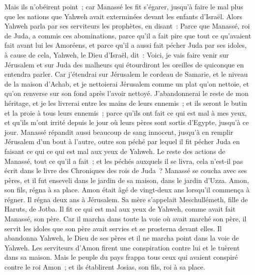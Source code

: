 \begin{multicols}{2}
Mais ils n'obéirent point~; car Manassé les fit s'égarer, jusqu'à faire le mal plus que les nations que Yahweh avait exterminées devant les enfants d'Israël.
Alors Yahweh parla par ses serviteurs les prophètes, en disant~:
Parce que Manassé, roi de Juda, a commis ces abominations, parce qu'il a fait pire que tout ce qu'avaient fait avant lui les Amoréens, et parce qu'il a aussi fait pécher Juda par ses idoles,
à cause de cela, Yahweh, le Dieu d'Israël, dit~: Voici, je vais faire venir sur Jérusalem et sur Juda des malheurs qui étourdiront les oreilles de quiconque en entendra parler.
Car j'étendrai sur Jérusalem le cordeau de Samarie, et le niveau de la maison d'Achab, et je nettoierai Jérusalem comme un plat qu'on nettoie, et qu’on renverse sur son fond après l'avoir nettoyé.
J'abandonnerai le reste de mon héritage, et je les livrerai entre les mains de leurs ennemis~; et ils seront le butin et la proie à tous leurs ennemis~;
parce qu'ils ont fait ce qui est mal à mes yeux, et qu'ils m'ont irrité depuis le jour où leurs pères sont sortis d'Egypte, jusqu'à ce jour.
Manassé répandit aussi beaucoup de sang innocent, jusqu'à en remplir Jérusalem d'un bout à l'autre, outre son péché par lequel il fit pécher Juda en faisant ce qui ce qui est mal aux yeux de Yahweh.
Le reste des actions de Manassé, tout ce qu'il a fait~; et les péchés auxquels il se livra, cela n'est-il pas écrit dans le livre des Chroniques des rois de Juda~?
Manassé se coucha avec ses pères, et il fut enseveli dans le jardin de sa maison, dans le jardin d'Uzza. Amon, son fils, régna à sa place.
Amon était âgé de vingt-deux ans lorsqu'il commença à régner. Il régna deux ans à Jérusalem. Sa mère s'appelait Meschullémeth, fille de Haruts, de Jotba.
Il fit ce qui est mal aux yeux de Yahweh, comme avait fait Manassé, son père.
Car il marcha dans toute la voie où avait marché son père, il servit les idoles que son père avait servies et se prosterna devant elles.
Il abandonna Yahweh, le Dieu de ses pères et il ne marcha point dans la voie de Yahweh.
Les serviteurs d'Amon firent une conspiration contre lui et le tuèrent dans sa maison.
Mais le peuple du pays frappa tous ceux qui avaient conspiré contre le roi Amon~; et ils établirent Josias, son fils, roi à sa place.

\end{multicols}
